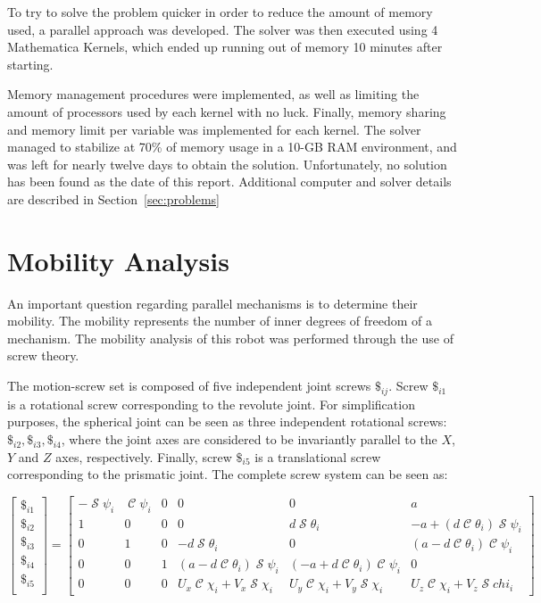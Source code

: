 \documentclass[titlepage, letterpaper]{article}
\DeclareMathOperator{\cose}{\mathcal{C}}
\DeclareMathOperator{\sen}{\mathcal{S}}
\begin{document}
To try to solve the problem quicker in order to reduce the amount of memory used, a parallel approach was developed.
The solver was then executed using 4 Mathematica Kernels, which ended up running out of memory 10 minutes after starting.

Memory management procedures were implemented, as well as limiting the amount of processors used by each kernel with no luck.
Finally, memory sharing and memory limit per variable was implemented for each kernel.
The solver managed to stabilize at 70\% of memory usage in a 10-GB RAM environment, and was left for nearly twelve days to obtain the solution.
Unfortunately, no solution has been found as the date of this report.
Additional computer and solver details are described in Section~\ref{sec:problems}

\section{Mobility Analysis}
\label{sec:mobility}

An important question regarding parallel mechanisms is to determine their mobility.
The mobility represents the number of inner degrees of freedom of a mechanism.
The mobility analysis of this robot was performed through the use of screw theory.

The motion-screw set is composed of five independent joint screws $\$_{ij}$.
Screw $\$_{i1}$ is a rotational screw corresponding to the revolute joint.
For simplification purposes, the spherical joint can be seen as three independent rotational screws: $\$_{i2}, \$_{i3}, \$_{i4}$, where the joint axes are considered to be invariantly parallel to the $X$, $Y$ and $Z$ axes, respectively.
Finally, screw $\$_{i5}$ is a translational screw corresponding to the prismatic joint.
The complete screw system can be seen as:

\begin{equation}
    \label{eq:screw-initial-sys}
    \begin{bmatrix}
        \$_{i1} \\
        \$_{i2} \\
        \$_{i3} \\
        \$_{i4} \\
        \$_{i5} \\
    \end{bmatrix}
    =
    \begin{bmatrix}
        -\sen \psi_i & \cose \psi_i & 0 & 0 & 0 & a \\
        1 & 0 & 0 & 0 & d\sen \theta_i & -a + (d \cose \theta_i)\sen \psi_i \\
        0 & 1 & 0 & -d \sen \theta_i & 0 & (a - d \cose \theta_i)\cose \psi_i \\
        0 & 0 & 1 & (a -d \cose \theta_i)\sen \psi_i & (-a + d \cose \theta_i)\cose \psi_i & 0 \\
        0 & 0 & 0 & U_x \cose \chi_i  + V_x \sen \chi_i & U_y \cose \chi_i + V_y \sen \chi_i & U_z \cose \chi_i + V_z \sen chi_i
    \end{bmatrix}
\end{equation}
\end{document}
